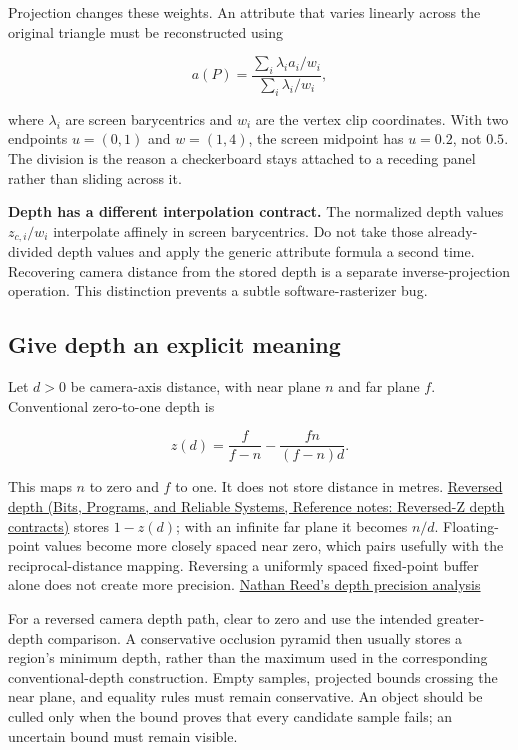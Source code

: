 Projection changes these weights. An attribute that varies linearly across the original triangle must be reconstructed using

\[
a(P)=\frac{\sum_i\lambda_i a_i/w_i}{\sum_i\lambda_i/w_i},
\]

where \(\lambda_i\) are screen barycentrics and \(w_i\) are the vertex clip coordinates. With two endpoints \(u=(0,1)\) and \(w=(1,4)\), the screen midpoint has \(u=0.2\), not \(0.5\). The division is the reason a checkerboard stays attached to a receding panel rather than sliding across it.

\textbf{Depth has a different interpolation contract.} The normalized depth values \(z_{c,i}/w_i\) interpolate affinely in screen barycentrics. Do not take those already-divided depth values and apply the generic attribute formula a second time. Recovering camera distance from the stored depth is a separate inverse-projection operation. This distinction prevents a subtle software-rasterizer bug.

\subsection{Give depth an explicit meaning}\label{03-visual-computing-i-ch012-give-depth-an-explicit-meaning}

Let \(d>0\) be camera-axis distance, with near plane \(n\) and far plane \(f\). Conventional zero-to-one depth is

\[
z(d)=\frac{f}{f-n}-\frac{fn}{(f-n)d}.
\]

This maps \(n\) to zero and \(f\) to one. It does not store distance in metres. \href{../01-Bits-Programs-and-Reliable-Systems/main.pdf\#nameddest=appendix-275ec8847057}{Reversed depth (Bits, Programs, and Reliable Systems, Reference notes: Reversed-Z depth contracts)} stores \(1-z(d)\); with an infinite far plane it becomes \(n/d\). Floating-point values become more closely spaced near zero, which pairs usefully with the reciprocal-distance mapping. Reversing a uniformly spaced fixed-point buffer alone does not create more precision. \href{https://developer.nvidia.com/blog/visualizing-depth-precision/}{Nathan Reed's depth precision analysis}

For a reversed camera depth path, clear to zero and use the intended greater-depth comparison. A conservative occlusion pyramid then usually stores a region's minimum depth, rather than the maximum used in the corresponding conventional-depth construction. Empty samples, projected bounds crossing the near plane, and equality rules must remain conservative. An object should be culled only when the bound proves that every candidate sample fails; an uncertain bound must remain visible.

